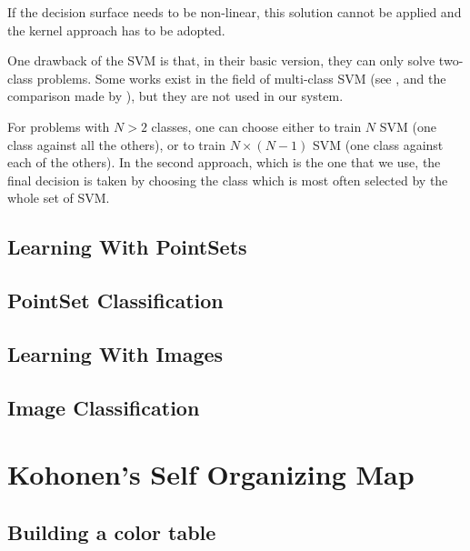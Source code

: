 	If the decision surface needs to be non-linear, this solution
	cannot be applied and the kernel approach has to be adopted.


One drawback of the SVM is that, in their basic version, they can only
solve two-class problems. Some works exist in the field of multi-class
SVM (see \cite{allwein00reducing,weston98multiclass}, and the
comparison made by \cite{hsu01comparison}), but they are
not used in our system.

For problems with $N > 2$ classes, one can choose either to train $N$
SVM (one class against all the others), or to train $N\times(N-1)$ SVM
(one class against each of the others). In the second approach, which
is the one that we use, the final decision is taken by choosing the
class which is most often selected by the whole set of SVM.


\subsection{Learning With PointSets}
\label{sec:LearningWithPointSets}

\subsection{PointSet Classification}
\label{sec:PointSetClassification}

\subsection{Learning With Images}
\label{sec:LearningWithImages}

\subsection{Image Classification}
\label{sec:ImageClassification}



\section{Kohonen's Self Organizing Map}
\label{sec:SOM}

\subsection{Building a color table}


